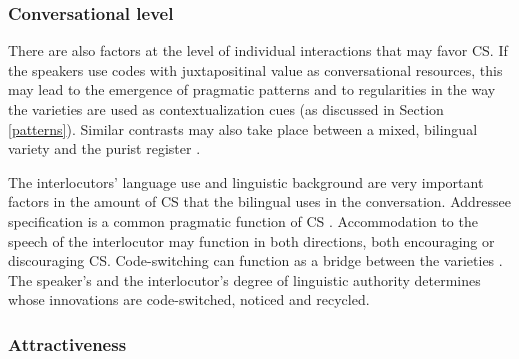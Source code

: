 \documentclass[output=paper,
modfonts
]{langscibook}
\begin{document}
\subsubsection*{Conversational level}

There are also factors at the level of individual interactions that may favor CS. If the speakers use codes with juxtapositinal value as conversational resources, this may lead to the emergence of pragmatic patterns and to regularities in the way the varieties are used as contextualization cues (as discussed in Section \ref{patterns}). Similar contrasts may also take place between a mixed, bilingual variety and the purist register \parencite{alvarez1998codeswitching,meeuwis1998monolectal}.

The interlocutors' language use and linguistic background are very important factors in the amount of CS that the bilingual uses in the conversation. Addressee specification is a common pragmatic function of CS \parencite{gumperz1982discourse}. Accommodation to the speech of the interlocutor may function in both directions, both encouraging or discouraging CS. Code-switching can function as a bridge between the varieties \parencite[pp. 78]{gardner2009code}. The speaker’s and the interlocutor’s degree of linguistic authority determines whose innovations are code-switched, noticed and recycled. 


\subsubsection*{Attractiveness}
\end{document}
